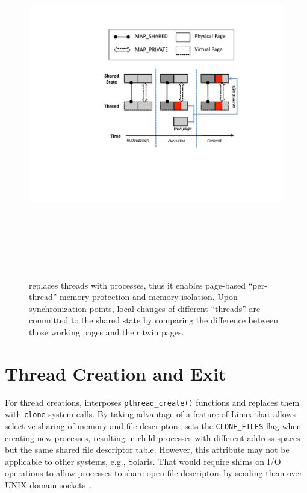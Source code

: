 \begin{figure}[!h]
\centering
\includegraphics[height=6in]{sheriff/figure/sheriffframework.pdf}
\caption{
\Sheriff{} replaces threads with processes, thus it enables page-based ``per-thread'' memory protection and memory isolation. Upon synchronization points, local changes of different ``threads'' are committed to the shared state by comparing the difference between those working pages and their twin pages. \label{fig:overview}}
\end{figure}

\section{Thread Creation and Exit}
\label{sec:threadcreat}

For thread creations, \sheriff{} interposes \texttt{pthread\_create()} functions and replaces them with \texttt{clone} system calls. 
By taking advantage of a feature of Linux that allows
selective sharing of memory and file descriptors, \sheriff{}
sets the \texttt{CLONE\_FILES} flag when creating new processes, resulting in child processes with different address spaces but the same shared file descriptor table. However, this attribute may not be applicable to other systems, e.g., Solaris. That would require shims on I/O operations to allow processes to share open file descriptors by sending
them over UNIX domain sockets~\cite[Section 17.4]{unixprogramming}.

